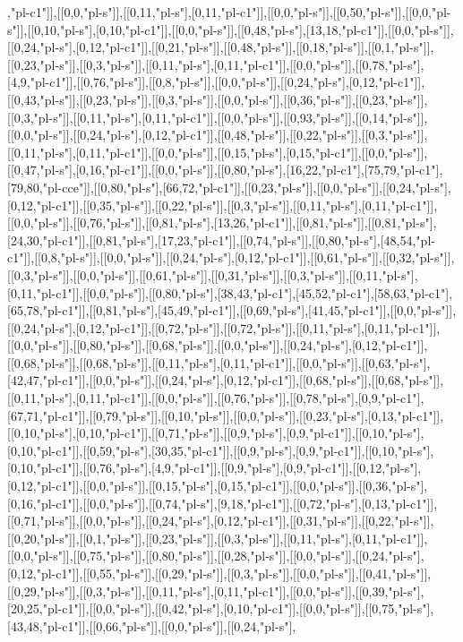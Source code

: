 ,"pl-c1"]],[[0,0,"pl-s"]],[[0,11,"pl-s"],[0,11,"pl-c1"]],[[0,0,"pl-s"]],[[0,50,"pl-s"]],[[0,0,"pl-s"]],[[0,10,"pl-s"],[0,10,"pl-c1"]],[[0,0,"pl-s"]],[[0,48,"pl-s"],[13,18,"pl-c1"]],[[0,0,"pl-s"]],[[0,24,"pl-s"],[0,12,"pl-c1"]],[[0,21,"pl-s"]],[[0,48,"pl-s"]],[[0,18,"pl-s"]],[[0,1,"pl-s"]],[[0,23,"pl-s"]],[[0,3,"pl-s"]],[[0,11,"pl-s"],[0,11,"pl-c1"]],[[0,0,"pl-s"]],[[0,78,"pl-s"],[4,9,"pl-c1"]],[[0,76,"pl-s"]],[[0,8,"pl-s"]],[[0,0,"pl-s"]],[[0,24,"pl-s"],[0,12,"pl-c1"]],[[0,43,"pl-s"]],[[0,23,"pl-s"]],[[0,3,"pl-s"]],[[0,0,"pl-s"]],[[0,36,"pl-s"]],[[0,23,"pl-s"]],[[0,3,"pl-s"]],[[0,11,"pl-s"],[0,11,"pl-c1"]],[[0,0,"pl-s"]],[[0,93,"pl-s"]],[[0,14,"pl-s"]],[[0,0,"pl-s"]],[[0,24,"pl-s"],[0,12,"pl-c1"]],[[0,48,"pl-s"]],[[0,22,"pl-s"]],[[0,3,"pl-s"]],[[0,11,"pl-s"],[0,11,"pl-c1"]],[[0,0,"pl-s"]],[[0,15,"pl-s"],[0,15,"pl-c1"]],[[0,0,"pl-s"]],[[0,47,"pl-s"],[0,16,"pl-c1"]],[[0,0,"pl-s"]],[[0,80,"pl-s"],[16,22,"pl-c1"],[75,79,"pl-c1"],[79,80,"pl-cce"]],[[0,80,"pl-s"],[66,72,"pl-c1"]],[[0,23,"pl-s"]],[[0,0,"pl-s"]],[[0,24,"pl-s"],[0,12,"pl-c1"]],[[0,35,"pl-s"]],[[0,22,"pl-s"]],[[0,3,"pl-s"]],[[0,11,"pl-s"],[0,11,"pl-c1"]],[[0,0,"pl-s"]],[[0,76,"pl-s"]],[[0,81,"pl-s"],[13,26,"pl-c1"]],[[0,81,"pl-s"]],[[0,81,"pl-s"],[24,30,"pl-c1"]],[[0,81,"pl-s"],[17,23,"pl-c1"]],[[0,74,"pl-s"]],[[0,80,"pl-s"],[48,54,"pl-c1"]],[[0,8,"pl-s"]],[[0,0,"pl-s"]],[[0,24,"pl-s"],[0,12,"pl-c1"]],[[0,61,"pl-s"]],[[0,32,"pl-s"]],[[0,3,"pl-s"]],[[0,0,"pl-s"]],[[0,61,"pl-s"]],[[0,31,"pl-s"]],[[0,3,"pl-s"]],[[0,11,"pl-s"],[0,11,"pl-c1"]],[[0,0,"pl-s"]],[[0,80,"pl-s"],[38,43,"pl-c1"],[45,52,"pl-c1"],[58,63,"pl-c1"],[65,78,"pl-c1"]],[[0,81,"pl-s"],[45,49,"pl-c1"]],[[0,69,"pl-s"],[41,45,"pl-c1"]],[[0,0,"pl-s"]],[[0,24,"pl-s"],[0,12,"pl-c1"]],[[0,72,"pl-s"]],[[0,72,"pl-s"]],[[0,11,"pl-s"],[0,11,"pl-c1"]],[[0,0,"pl-s"]],[[0,80,"pl-s"]],[[0,68,"pl-s"]],[[0,0,"pl-s"]],[[0,24,"pl-s"],[0,12,"pl-c1"]],[[0,68,"pl-s"]],[[0,68,"pl-s"]],[[0,11,"pl-s"],[0,11,"pl-c1"]],[[0,0,"pl-s"]],[[0,63,"pl-s"],[42,47,"pl-c1"]],[[0,0,"pl-s"]],[[0,24,"pl-s"],[0,12,"pl-c1"]],[[0,68,"pl-s"]],[[0,68,"pl-s"]],[[0,11,"pl-s"],[0,11,"pl-c1"]],[[0,0,"pl-s"]],[[0,76,"pl-s"]],[[0,78,"pl-s"],[0,9,"pl-c1"],[67,71,"pl-c1"]],[[0,79,"pl-s"]],[[0,10,"pl-s"]],[[0,0,"pl-s"]],[[0,23,"pl-s"],[0,13,"pl-c1"]],[[0,10,"pl-s"],[0,10,"pl-c1"]],[[0,71,"pl-s"]],[[0,9,"pl-s"],[0,9,"pl-c1"]],[[0,10,"pl-s"],[0,10,"pl-c1"]],[[0,59,"pl-s"],[30,35,"pl-c1"]],[[0,9,"pl-s"],[0,9,"pl-c1"]],[[0,10,"pl-s"],[0,10,"pl-c1"]],[[0,76,"pl-s"],[4,9,"pl-c1"]],[[0,9,"pl-s"],[0,9,"pl-c1"]],[[0,12,"pl-s"],[0,12,"pl-c1"]],[[0,0,"pl-s"]],[[0,15,"pl-s"],[0,15,"pl-c1"]],[[0,0,"pl-s"]],[[0,36,"pl-s"],[0,16,"pl-c1"]],[[0,0,"pl-s"]],[[0,74,"pl-s"],[9,18,"pl-c1"]],[[0,72,"pl-s"],[0,13,"pl-c1"]],[[0,71,"pl-s"]],[[0,0,"pl-s"]],[[0,24,"pl-s"],[0,12,"pl-c1"]],[[0,31,"pl-s"]],[[0,22,"pl-s"]],[[0,20,"pl-s"]],[[0,1,"pl-s"]],[[0,23,"pl-s"]],[[0,3,"pl-s"]],[[0,11,"pl-s"],[0,11,"pl-c1"]],[[0,0,"pl-s"]],[[0,75,"pl-s"]],[[0,80,"pl-s"]],[[0,28,"pl-s"]],[[0,0,"pl-s"]],[[0,24,"pl-s"],[0,12,"pl-c1"]],[[0,55,"pl-s"]],[[0,29,"pl-s"]],[[0,3,"pl-s"]],[[0,0,"pl-s"]],[[0,41,"pl-s"]],[[0,29,"pl-s"]],[[0,3,"pl-s"]],[[0,11,"pl-s"],[0,11,"pl-c1"]],[[0,0,"pl-s"]],[[0,39,"pl-s"],[20,25,"pl-c1"]],[[0,0,"pl-s"]],[[0,42,"pl-s"],[0,10,"pl-c1"]],[[0,0,"pl-s"]],[[0,75,"pl-s"],[43,48,"pl-c1"]],[[0,66,"pl-s"]],[[0,0,"pl-s"]],[[0,24,"pl-s"],
